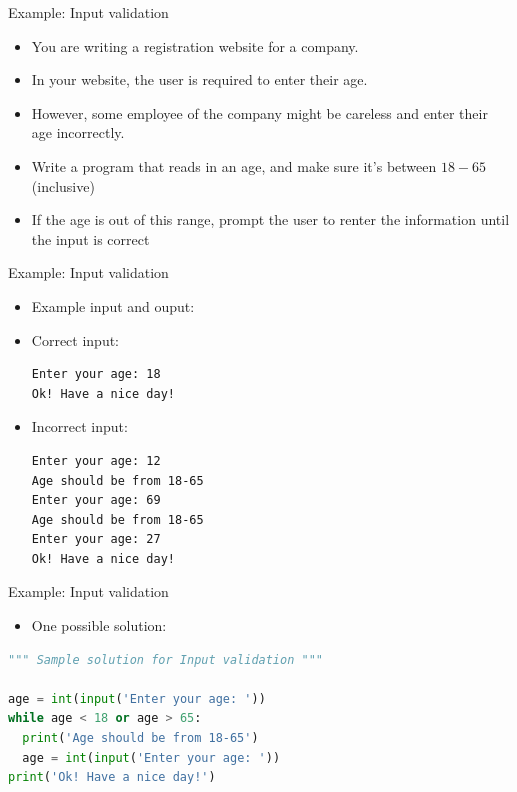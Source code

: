 \documentclass[10pt,xcolor={table,dvipsnames},t]{beamer}
\begin{document}


\begin{frame}{Example: Input validation}
  \begin{itemize}
    \item You are writing a registration website for a company. 
    \item In your website, the user is required to enter their age. 
    \item However, some employee of the company might be careless and enter their age incorrectly.
    \item Write a program that reads in an age, and make sure it's between $18-65$ (inclusive)
    \item If the age is out of this range, prompt the user to renter the information until the input is correct
  \end{itemize}
\end{frame}

\begin{frame}[fragile]{Example: Input validation}
  \begin{itemize}
    \item Example input and ouput:
    \item Correct input:
\begin{lstlisting}
Enter your age: 18
Ok! Have a nice day!
\end{lstlisting}
  \item Incorrect input:
\begin{lstlisting}
Enter your age: 12
Age should be from 18-65
Enter your age: 69
Age should be from 18-65
Enter your age: 27
Ok! Have a nice day!
\end{lstlisting}
  \end{itemize}

\end{frame}

\begin{frame}[fragile]{Example: Input validation}
\begin{itemize}
  \item One possible solution:
\end{itemize}
\begin{lstlisting}[language=python]
""" Sample solution for Input validation """

age = int(input('Enter your age: '))
while age < 18 or age > 65:
  print('Age should be from 18-65')
  age = int(input('Enter your age: '))
print('Ok! Have a nice day!')
\end{lstlisting}
\end{frame}
\end{document}
